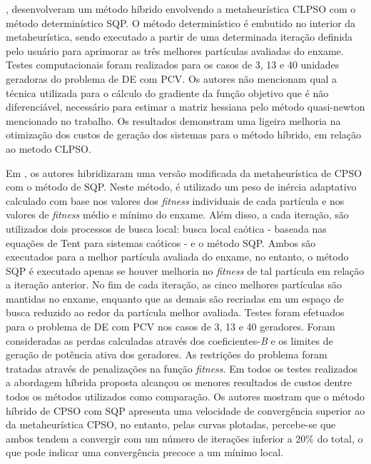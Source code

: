 \documentclass[
	12pt,				%
	openany,			%
	twoside,			%
	a4paper,			%
	chapter=TITLE,		%
	section=Title,		%
	subsection=Title,	%
	subsubsection=Title,%
	english,			%
	french,				%
	spanish,			%
	brazil			%
	]{abntex2}
\begin{document}
\begin{ERRATA}
, desenvolveram um método híbrido envolvendo a metaheurística CLPSO com o método determinístico SQP. O método determinístico é embutido no interior da metaheurística, sendo executado a partir de uma determinada iteração definida pelo usuário para aprimorar as três melhores partículas avaliadas do enxame. Testes computacionais foram realizados para os casos de 3, 13 e 40 unidades geradoras do problema de DE com PCV. Os autores não mencionam qual a técnica utilizada para o cálculo do gradiente da função objetivo que é não diferenciável, necessário para estimar a matriz hessiana pelo método quasi-newton mencionado no trabalho. Os resultados demonstram uma ligeira melhoria na otimização dos custos de geração dos sistemas para o método híbrido, em relação ao metodo CLPSO.

Em , os autores hibridizaram uma versão modificada da metaheurística de CPSO com o método de SQP. Neste método, é utilizado um peso de inércia adaptativo calculado com base nos valores dos \emph{fitness} individuais de cada partícula e nos valores de \emph{fitness} médio e mínimo do enxame. Além disso, a cada iteração, são utilizados dois processos de busca local: busca local caótica - baseada nas equações de Tent para sistemas caóticos - e o método SQP. Ambos são executados para a melhor partícula avaliada do enxame, no entanto, o método SQP é executado apenas se houver melhoria no \emph{fitness} de tal partícula em relação a iteração anterior. No fim de cada iteração, as cinco melhores partículas são mantidas no enxame, enquanto que as demais são recriadas em um espaço de busca reduzido ao redor da partícula melhor avaliada. Testes foram efetuados para o problema de DE com PCV nos casos de 3, 13 e 40 geradores. Foram consideradas as perdas calculadas através dos coeficientes-\emph{B} e os limites de geração de potência ativa dos geradores. As restrições do problema foram tratadas através de penalizações na função \emph{fitness}. Em todos os testes realizados a abordagem híbrida proposta alcançou os menores resultados de custos dentre todos os métodos utilizados como comparação. Os autores mostram que o método híbrido de CPSO com SQP apresenta uma velocidade de convergência superior ao da metaheurística CPSO, no entanto, pelas curvas plotadas, percebe-se que ambos tendem a convergir com um número de iterações inferior a 20\% do total, o que pode indicar uma convergência precoce a um mínimo local. 


\end{ERRATA}
\end{document}
